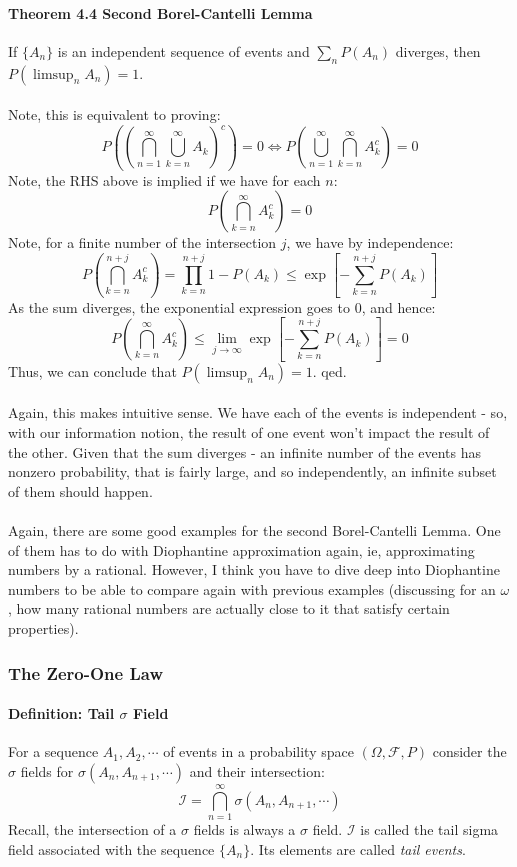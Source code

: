 \documentclass[12pt,a4paper]{article}
\newcommand{\1}[1]{\mathbbm{1}\left\{ #1 \right\}}
\newcommand{\ical}{\mathcal{I}}
\newcommand{\fcal}{\mathcal{F}}
\begin{document}
\paragraph{Theorem 4.4 Second Borel-Cantelli Lemma} If $\{A_n\}$ is an independent sequence of events and $\sum_nP(A_n)$ diverges, then $P(\limsup_n A_n) = 1$.
\\\\
Note, this is equivalent to proving:
$$
	P\left(\left(\bigcap_{n=1}^\infty \bigcup_{k=n}^\infty A_k\right)^c\right) = 0 \iff
	P\left(\bigcup_{n=1}^\infty \bigcap_{k=n}^\infty A_k^c\right) = 0
$$
Note, the RHS above is implied if we have for each $n$:
$$
	P\left(\bigcap_{k=n}^\infty A_k^c\right) = 0
$$
Note, for a finite number of the intersection $j$, we have by independence:
$$
	P\left(\bigcap_{k=n}^{n+j} A_k^c\right) =
	\prod_{k=n}^{n+j} 1 - P\left(A_k\right) \leq
	\exp\left[-\sum_{k=n}^{n+j} P(A_k)\right]
$$
As the sum diverges, the exponential expression goes to $0$, and hence:
$$
	P\left(\bigcap_{k=n}^\infty A_k^c\right) \leq \lim_{j \to \infty} \exp\left[-\sum_{k=n}^{n+j} P(A_k)\right] = 0
$$
Thus, we can conclude that $P(\limsup_n A_n) = 1$. qed.
\\\\
Again, this makes intuitive sense. We have each of the events is independent - so, with our information notion, the result of one event won't impact the result of the other. Given that the sum diverges - an infinite number of the events has nonzero probability, that is fairly large, and so independently, an infinite subset of them should happen.
\\\\
Again, there are some good examples for the second Borel-Cantelli Lemma. One of them has to do with Diophantine approximation again, ie, approximating numbers by a rational. However, I think you have to dive deep into Diophantine numbers to be able to compare again with previous examples (discussing for an $\omega$, how many rational numbers are actually close to it that satisfy certain properties).

\subsubsection{The Zero-One Law}

\paragraph{Definition: Tail $\sigma$ Field} For a sequence $A_1, A_2, \cdots$ of events in a probability space $(\Omega, \fcal, P)$ consider the $\sigma$ fields for $\sigma(A_n, A_{n+1}, \cdots)$ and their intersection:
$$
	\ical = \bigcap_{n=1}^\infty \sigma(A_n, A_{n+1}, \cdots)
$$
Recall, the intersection of a $\sigma$ fields is always a $\sigma$ field. $\ical$ is called the tail sigma field associated with the sequence $\{A_n\}$. Its elements are called \textit{tail events}.
\end{document}
